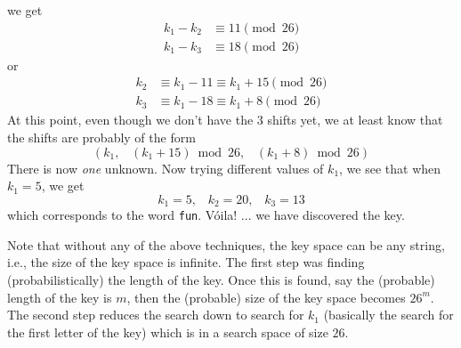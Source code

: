 we get
\begin{align*}
k_1 - k_2 &\equiv 11 \pmod{26} \\
k_1 - k_3 &\equiv 18 \pmod{26} 
\end{align*}
or
\begin{align*}
k_2 &\equiv k_1 - 11 \equiv k_1 + 15\pmod{26} \\
k_3 &\equiv k_1 - 18 \equiv k_1 + 8 \pmod{26} 
\end{align*}
At this point, even though we don't have the 3 shifts yet,
we at least know that the shifts are probably of the form
\[
(k_1, \,\,\,\,\, (k_1 + 15)\bmod{26}, \,\,\,\,\, (k_1 + 8) \bmod{26})
\]
There is now \textit{one} unknown.
Now trying different values of $k_1$, we see that when
$k_1 = 5$, we get
\[
k_1 = 5, \,\,\,\,\, k_2 = 20, \,\,\,\,\, k_3 = 13 
\]
which corresponds to the word \verb!fun!.
V\'oila! ... we have discovered the key.

Note that without any of the above techniques, the key space can be any
string, i.e., the size of the key space is infinite.
The first step was finding (probabilistically) the length of the key.
Once this is found, say the (probable) length of the key is $m$,
then the (probable) size of the key space becomes $26^m$.
The second step reduces the search down to search for $k_1$
(basically the search for the first letter of the key)
which is in a search space of size $26$.
